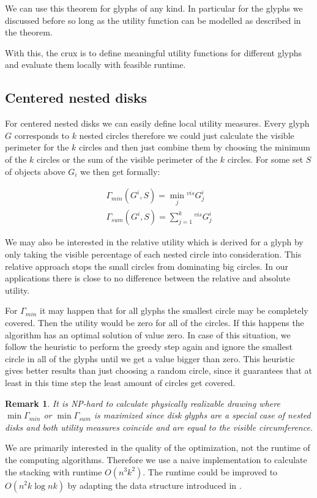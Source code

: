 \documentclass[a4paper,11pt]{article}
\newtheorem*{remark}{Remark}
\begin{document}
We can use this theorem for glyphs of any kind. In particular for the glyphs we discussed before so long as the utility function can be modelled as described in the theorem.

With this, the crux is to define meaningful utility functions for different glyphs and evaluate them locally with feasible runtime.

\subsection{Centered nested disks}

For centered nested disks we can easily define local utility measures. Every glyph $G$ corresponds to $k$ nested circles therefore we could just calculate the visible perimeter for the $k$ circles and then just combine them by choosing the minimum of the $k$ circles or the sum of the visible perimeter of the $k$ circles. For some set $S$ of objects above $G_i$ we then get formally:

\begin{align*}
  \Gamma_{min}({G^i,S})=\min_j  {^{vis} G^i_j} \\
  \Gamma_{sum}({G^i,S})=\sum_{j=1}^k  {^{vis} G^i_j}
\end{align*}

We may also be interested in the relative utility which is derived for a glyph by only taking the visible percentage of each nested circle into consideration. This relative approach stops the small circles from dominating big circles. In our applications there is close to no difference between the relative and absolute utility.

For $\Gamma_{min}$ it may happen that for all glyphs the smallest circle may be completely covered. Then the utility would be zero for all of the circles. If this happens the algorithm has an optimal solution of value zero. In case of this situation, we follow the heuristic to perform the greedy step again and ignore the smallest circle in all of the glyphs until we get a value bigger than zero. This heuristic gives better results than just choosing a random circle, since it guarantees that at least in this time step the least amount of circles get covered.
%
\begin{remark}
  It is NP-hard to calculate physically realizable drawing where $\min\Gamma_{min}$ or $\min\Gamma_{sum}$ is maximized since disk glyphs are a special case of nested disks and both utility measures coincide and are equal to the visible circumference.
\end{remark}
We are primarily interested in the quality of the optimization, not the runtime of the computing algorithms. Therefore we use a naive implementation to calculate the stacking with runtime $O(n^3k^2)$. The runtime could be improved to $O(n^2k \log nk)$ by adapting the data structure introduced in \cite{cabello}.
\end{document}
